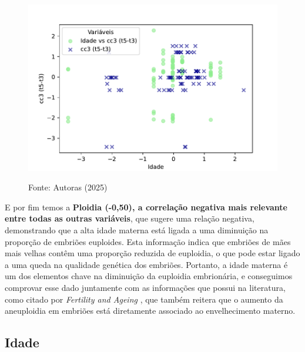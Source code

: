 \begin{figure}[h]
\begin{minipage}[b]{0.45\linewidth}
        \includegraphics[scale=0.35]{figuras/Spearman/idade-cc3.pdf}
        \vspace{0.3cm}
        \begin{minipage}{\linewidth}
            \centering
            \scriptsize{Fonte: Autoras (2025)}
        \end{minipage}
    \end{minipage}
\end{figure}
\FloatBarrier

E por fim temos a \textbf{Ploidia (-0,50), a correlação negativa mais relevante entre todas as outras variáveis}, que sugere uma relação negativa, demonstrando que a alta idade materna está ligada a uma diminuição na proporção de embriões euploides. Esta informação indica que embriões de mães mais velhas contêm uma proporção reduzida de euploidia, o que pode estar ligado a uma queda na qualidade genética dos embriões. Portanto, a idade materna é um dos elementos chave na diminuição da euploidia embrionária, e conseguimos comprovar esse dado juntamente com as informações que possui na literatura, como citado por \textit{Fertility and Ageing} \cite{eshre2005}, que também reitera que o aumento da aneuploidia em embriões está diretamente associado ao envelhecimento materno.

\subsection*{Idade}

